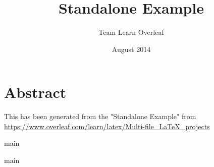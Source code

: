 \documentclass{article}
\title{Standalone Example}
\author{Team Learn Overleaf}
\date{August 2014}
\begin{document}
\maketitle

\tableofcontents

\section{Abstract}

This has been generated from the "Standalone Example" from \url{https://www.overleaf.com/learn/latex/Multi-file_LaTeX_projects}

{main}

{main}
\end{document}
